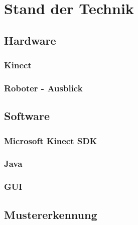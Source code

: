 \chapter{Stand der Technik}
\label{chap:Stand der Technik}

\section{Hardware}
\subsection{Kinect}
\subsection {Roboter - Ausblick}
\section{Software}

\subsection{Microsoft Kinect SDK}
\subsection{Java}

\subsection{GUI}

\section{Mustererkennung}
